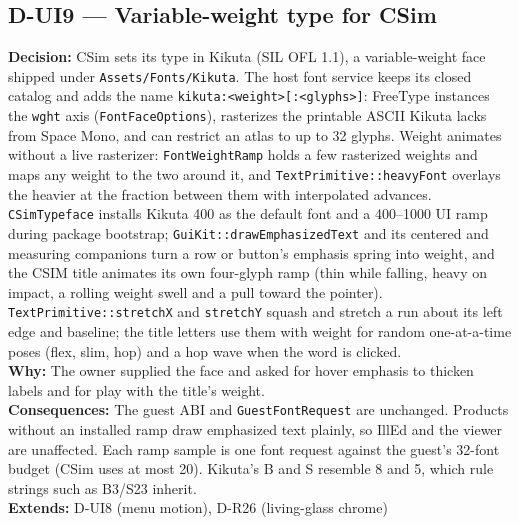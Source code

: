 \subsection*{D-UI9 --- Variable-weight type for CSim}
\begin{decisionbox}[title={D-UI9 \quad 2026-09-23}]
\textbf{Decision:} CSim sets its type in Kikuta (SIL OFL 1.1), a
variable-weight face shipped under \texttt{Assets/Fonts/Kikuta}. The host font
service keeps its closed catalog and adds the name
\texttt{kikuta:<weight>[:<glyphs>]}: FreeType instances the \texttt{wght} axis
(\texttt{FontFaceOptions}), rasterizes the printable ASCII Kikuta lacks from
Space Mono, and can restrict an atlas to up to 32 glyphs. Weight animates
without a live rasterizer: \texttt{FontWeightRamp} holds a few rasterized
weights and maps any weight to the two around it, and
\texttt{TextPrimitive::heavyFont} overlays the heavier at the fraction between
them with interpolated advances. \texttt{CSimTypeface} installs Kikuta 400 as
the default font and a 400--1000 UI ramp during package bootstrap;
\texttt{GuiKit::drawEmphasizedText} and its centered and measuring companions
turn a row or button's emphasis spring into weight, and the CSIM title animates
its own four-glyph ramp (thin while falling, heavy on impact, a rolling weight
swell and a pull toward the pointer). \texttt{TextPrimitive::stretchX} and
\texttt{stretchY} squash and stretch a run about its left edge and baseline;
the title letters use them with weight for random one-at-a-time poses (flex,
slim, hop) and a hop wave when the word is clicked.\\
\textbf{Why:} The owner supplied the face and asked for hover emphasis to
thicken labels and for play with the title's weight.\\
\textbf{Consequences:} The guest ABI and \texttt{GuestFontRequest} are
unchanged. Products without an installed ramp draw emphasized text plainly, so
IllEd and the viewer are unaffected. Each ramp sample is one font request
against the guest's 32-font budget (CSim uses at most 20). Kikuta's B and S
resemble 8 and 5, which rule strings such as B3/S23 inherit.\\
\textbf{Extends:} D-UI8 (menu motion), D-R26 (living-glass chrome)
\end{decisionbox}

